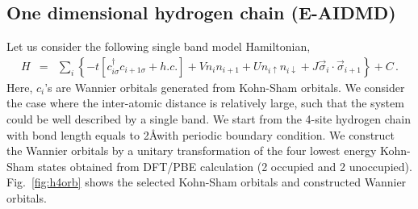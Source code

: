 \documentclass[prl,12pt,onecolumn,nofootinbib,notitlepage,english,superscriptaddress]{revtex4-1}
\newcommand{\HJC}[1]{{\color{RED}{\bf HJC: #1}}}
\begin{document}
\HJC{Transferability??}

\subsection{One dimensional hydrogen chain (E-AIDMD)}
Let us consider the following single band model Hamiltonian,
\begin{eqnarray}\label{eq:h4model}
H &=& \sum_{i}\left\{-t[c^{\dagger}_{i\sigma}c_{i+1\sigma} +h.c.]+ Vn_{i}n_{i+1} + Un_{i\uparrow}n_{i\downarrow}+ J\vec \sigma_{i}\cdot \vec \sigma_{i+1}\right\} + C\,.
\end{eqnarray}
Here, $c_{i}$'s are Wannier orbitals generated from Kohn-Sham orbitals. We consider the case where the inter-atomic distance is relatively large, such that the system could be well described by a single band.  We start from the 4-site hydrogen chain with bond length equals to 2\AA with periodic boundary condition. We construct the Wannier orbitals by a unitary transformation of the four lowest energy Kohn-Sham states obtained from DFT/PBE calculation (2 occupied and 2 unoccupied). Fig.~\ref{fig:h4orb} shows the selected Kohn-Sham orbitals and constructed Wannier orbitals. 
\end{document}
